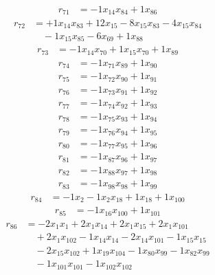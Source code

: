 \[\begin{aligned}
r_{71} &= - 1 x_{14} x_{84} + 1 x_{86}
\end{aligned}\]
\[\begin{aligned}
r_{72} &= + 1 x_{14} x_{83} + 12 x_{15} - 8 x_{15} x_{83} - 4 x_{15} x_{84} \\
 &\quad - 1 x_{15} x_{85} - 6 x_{69} + 1 x_{88}
\end{aligned}\]
\[\begin{aligned}
r_{73} &= - 1 x_{14} x_{70} + 1 x_{15} x_{70} + 1 x_{89}
\end{aligned}\]
\[\begin{aligned}
r_{74} &= - 1 x_{71} x_{89} + 1 x_{90}
\end{aligned}\]
\[\begin{aligned}
r_{75} &= - 1 x_{72} x_{90} + 1 x_{91}
\end{aligned}\]
\[\begin{aligned}
r_{76} &= - 1 x_{73} x_{91} + 1 x_{92}
\end{aligned}\]
\[\begin{aligned}
r_{77} &= - 1 x_{74} x_{92} + 1 x_{93}
\end{aligned}\]
\[\begin{aligned}
r_{78} &= - 1 x_{75} x_{93} + 1 x_{94}
\end{aligned}\]
\[\begin{aligned}
r_{79} &= - 1 x_{76} x_{94} + 1 x_{95}
\end{aligned}\]
\[\begin{aligned}
r_{80} &= - 1 x_{77} x_{95} + 1 x_{96}
\end{aligned}\]
\[\begin{aligned}
r_{81} &= - 1 x_{87} x_{96} + 1 x_{97}
\end{aligned}\]
\[\begin{aligned}
r_{82} &= - 1 x_{88} x_{97} + 1 x_{98}
\end{aligned}\]
\[\begin{aligned}
r_{83} &= - 1 x_{98} x_{98} + 1 x_{99}
\end{aligned}\]
\[\begin{aligned}
r_{84} &= - 1 x_{2} - 1 x_{2} x_{18} + 1 x_{18} + 1 x_{100}
\end{aligned}\]
\[\begin{aligned}
r_{85} &= - 1 x_{16} x_{100} + 1 x_{101}
\end{aligned}\]
\[\begin{aligned}
r_{86} &= - 2 x_{1} x_{1} + 2 x_{1} x_{14} + 2 x_{1} x_{15} + 2 x_{1} x_{101} \\
 &\quad + 2 x_{1} x_{102} - 1 x_{14} x_{14} - 2 x_{14} x_{101} - 1 x_{15} x_{15} \\
 &\quad - 2 x_{15} x_{102} + 1 x_{19} x_{104} - 1 x_{80} x_{99} - 1 x_{82} x_{99} \\
 &\quad - 1 x_{101} x_{101} - 1 x_{102} x_{102}
\end{aligned}\]
